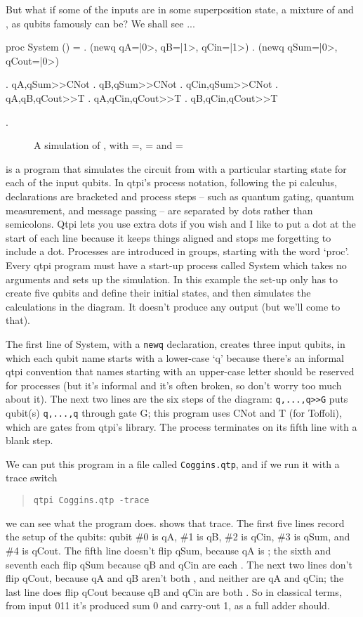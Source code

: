 \documentclass[11pt,a4paper]{book}
\makeatletter
\newcommand{\mvb}[1]{\begin{myverbbox}[\ifthenelse{\equal{\the\verbatim@line}{}}{\vspace{-5pt}}{}]{#1}}
\newcommand{\verbtt}[1]{\texttt{\small{}#1}}
\makeatother
\begin{document}
But what if some of the inputs are in some superposition state, a mixture of \zero{} and \one{}, as qubits famously can be? We shall see ...

\mvb{\Cogginszerooneone}
proc System () =
  . (newq qA=|0>, qB=|1>, qCin=|1>) 
  . (newq qSum=|0>, qCout=|0>) 
  
  . qA,qSum>>CNot  . qB,qSum>>CNot    . qCin,qSum>>CNot 
  . qA,qB,qCout>>T . qA,qCin,qCout>>T . qB,qCin,qCout>>T 
  
  .
\end{myverbbox}
\begin{figure}
\centering
\Cogginszerooneone
\caption{A simulation of , with \bv{\alpha}=\zero{}, \bv{\beta}=\one{} and \bv{\gamma}=\one{}}
\end{figure}

 is a program that simulates the circuit from  with a particular starting state for each of the input qubits. In qtpi's process notation, following the pi calculus, declarations are bracketed and process steps -- such as quantum gating, quantum measurement, and message passing -- are separated by dots rather than semicolons. Qtpi lets you use extra dots if you wish and I like to put a dot at the start of each line because it keeps things aligned and stops me forgetting to include a dot.  Processes are introduced in groups, starting with the word `proc'. Every qtpi program must have a start-up process called System which takes no arguments and sets up the simulation. In this example the set-up only has to create five qubits and define their initial states, and then simulates the calculations in the diagram. It doesn't produce any output (but we'll come to that). 

The first line of System, with a \verbtt{newq} declaration, creates three input qubits, in which each qubit name starts with a lower-case `q' because there's an informal qtpi convention that names starting with an upper-case letter should be reserved for processes (but it's informal and it's often broken, so don't worry too much about it). The next two lines are the six steps of the diagram: \verbtt{q,...,q>>G} puts qubit(s) \verbtt{q,...,q} through gate G; this program uses CNot and T (for Toffoli), which are gates from qtpi's library. The process terminates on its fifth line with a blank step.

We can put this program in a file called \verbtt{Coggins.qtp}, and if we run it with a trace switch
\begin{quote}
\verbtt{qtpi Coggins.qtp -trace}
\end{quote}
we can see what the program does.  shows that trace. The first five lines record the setup of the qubits: qubit \#0 is qA, \#1 is qB, \#2 is qCin, \#3 is qSum, and \#4 is qCout. The fifth line doesn't flip qSum, because qA is \zero{}; the sixth and seventh each flip qSum because qB and qCin are each \one{}. The next two lines don't flip qCout, because qA and qB aren't both \one{}, and neither are qA and qCin; the last line does flip qCout because qB and qCin are both \one{}. So in classical terms, from input 011 it's produced sum 0 and carry-out 1, as a full adder should.  
\end{document}
